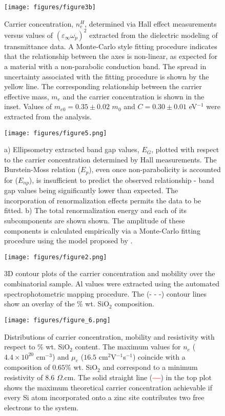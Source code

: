 \documentclass[aps,prl,preprint,showpacs,showkeys, linenumbers]{revtex4-1}
\begin{document}
\begin{figure}[p]
\centering
\texttt{[image: figures/figure3b]}
\caption{\label{fig:3} Carrier concentration, $n_e^H$, determined via Hall effect measurements versus values of $(\varepsilon_{\infty}\omega_p)^2$ extracted from the dielectric modeling of transmittance data. A Monte-Carlo style fitting procedure \cite{Mendelsberg2009, Anders2012} indicates that the relationship between the axes is non-linear, as expected for a material with a non-parabolic conduction band. The spread in uncertainty associated with the fitting procedure is shown by the yellow line. The corresponding relationship between the carrier effective mass, $m_e$ and the carrier concentration is shown in the inset. Values of $m_{e0}=0.35 \pm 0.02$ $m_{0}$ and $C = 0.30 \pm 0.01$ eV$^{-1}$ were extracted from the analysis.}
\end{figure}

\begin{figure}[p]
\centering
\texttt{[image: figures/figure5.png]}
\caption{\label{fig:4} a) Ellipsometry extracted band gap values, $E_G$, plotted with respect to the carrier concentration determined by Hall measurements. The Burstein-Moss relation ($E_p$), even once non-parabolicity is accounted for ($E_{np}$), is insufficient to predict the observed relationship - band gap values being significantly lower than expected. The incorporation of renormalization effects permits the data to be fitted. b) The total renormalization energy and each of its subcomponents are shown shown. The amplitude of these components is calculated empirically via a Monte-Carlo fitting procedure using the model proposed by \cite{Jain1990}. }
\end{figure}


\begin{figure}[p]
\centering
\texttt{[image: figures/figure2.png]}
\caption{\label{fig:5} 3D contour plots of the carrier concentration and mobility over the combinatorial sample. Al values were extracted using the automated spectrophotometric mapping procedure. The (- - -) contour lines show an overlay of the \% wt. SiO$_{2}$ composition.}
\end{figure}

\begin{figure}[p]
\centering
\texttt{[image: figures/figure\_6.png]}
\caption{\label{fig:6} Distributions of carrier concentration, mobility and resistivity with respect to \% wt. SiO$_{2}$ content. The maximum values for $n_e$ ($4.4\times10^{20}$ cm$^{-3}$) and $\mu_{e}$ ($16.5$ cm$^{2}$V$^{-1}$s$^{-1}$) coincide with a composition of $0.65$\% wt. SiO$_{2}$ and correspond to a minimum resistivity of $8.6$ $\Omega$.cm. The solid straight line (\textcolor{red}{\textbf{---}}) in the top plot shows the maximum theoretical carrier concentration achievable if every Si atom incorporated onto a zinc site contributes two free electrons to the system.}
\end{figure}
\end{document}
